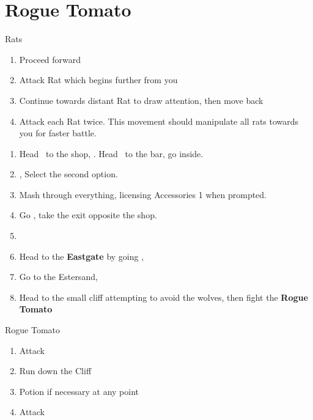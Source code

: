 \chapter{Rogue Tomato}
\begin{battle}{Rats}
	\begin{enumerate}
		\item Proceed forward
		\item Attack Rat which begins further from you
		\item Continue towards distant Rat to draw attention, then move back
		\item Attack each Rat twice. This movement should manipulate all rats towards you for faster battle.
	\end{enumerate}
\end{battle}
\begin{enumerate}
	\item Head \south\ to the shop, \cs. Head \north\ to the bar, go inside.
	\item \cs, Select the second option.
           \item Mash through everything, licensing Accessories 1 when prompted.
	\item Go \south, take the exit opposite the shop.
	\item {}
	\item Head to the \textbf{Eastgate} by going \east, \cs
	\item Go to the Estersand, \cs
	\item Head to the small cliff attempting to avoid the wolves, then fight the \textbf{Rogue Tomato}
\end{enumerate}
\begin{battle}{Rogue Tomato}
	\begin{enumerate}
		\item Attack
		\item Run down the Cliff
		\item Potion if necessary at any point
		\item Attack
	\end{enumerate}
\end{battle}